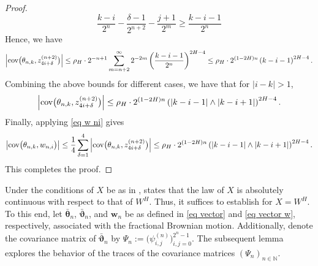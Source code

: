 \documentclass[12pt,reqno]{article}
\numberwithin{equation}{section}
\def\cov{\mbox{cov}}
\def\var{\mbox{var}}
\theoremstyle{definition}
\def\cov{\hbox{\rm cov}}\def\var{\text{\rm Var}}
\newcommand{\bN}{\mathbb{N}}
\begin{document}
\begin{proof}
\begin{equation*}
		\frac{k-i}{2^n} - \frac{\delta -1}{2^{n+2}} - \frac{j+1}{2^m} \ge \frac{k - i -1}{2^n}
	\end{equation*}
	Hence, we have
	\begin{equation*}
		\left|\cov\big(\theta_{n,k}, z^{(n+2)}_{4i+\delta}\big)\right|  \le \rho_H\cdot 2^{-n+1}\sum_{m = n+2}^\infty 2^{-2m}\left(\frac{k-i-1}{2^{n}}\right)^{2H-4}  \le \rho_H \cdot 2^{(1-2H)n}\left(k-i -1\right)^{2H-4}.
	\end{equation*}
	Combining the above bounds for different cases, we have that for $|i -k| > 1$, 
	\begin{equation*}
		\left|\cov\big(\theta_{n,k}, z^{(n+2)}_{4i+\delta}\big)\right| \le \rho_H\cdot 2^{(1-2H)n}\left(\left|{k-i-1}\right| \wedge \left|{k-i+1}\right|\right)^{2H-4}. 
	\end{equation*}
	Finally, applying \eqref{eq w ni} gives 
	\begin{equation*}
		\big|\cov\big(\theta_{n,k},w_{n,i}\big)\big| \le \frac{1}{4}\sum_{\delta = 1}^{4}\left|\cov\big(\theta_{n,k}, z^{(n+2)}_{4i+\delta}\big)\right|  \le \rho_H \cdot 2^{(1-2H)n}\left(\left|{k-i-1}\right| \wedge \left|{k-i+1}\right|\right)^{2H-4}.
	\end{equation*}
	This completes the proof.
\end{proof}

Under the conditions of $X$ be as in , \cite[Theorem 1.4]{HanSchiedGirsanov} states that the law of $X$ is absolutely continuous with respect to that of $W^H$. Thus, it suffices to establish  for $X=W^H$. To this end, let $\bar{\bm \theta}_n$, $\bar{\bm \vartheta}_n$, and $\bm w_n$ be as defined in \eqref{eq vector} and \eqref{eq vector w}, respectively, associated with the fractional Brownian motion. Additionally, denote the covariance matrix of $\bar{\bm \vartheta}_n$ by $\Psi_n := \big(\psi^{(n)}_{i,j}\big)_{i,j = 0}^{2^n-1}$. The subsequent lemma explores the behavior of the traces of the covariance matrices $(\Psi_n)_{n \in \bN}$.
\end{document}
